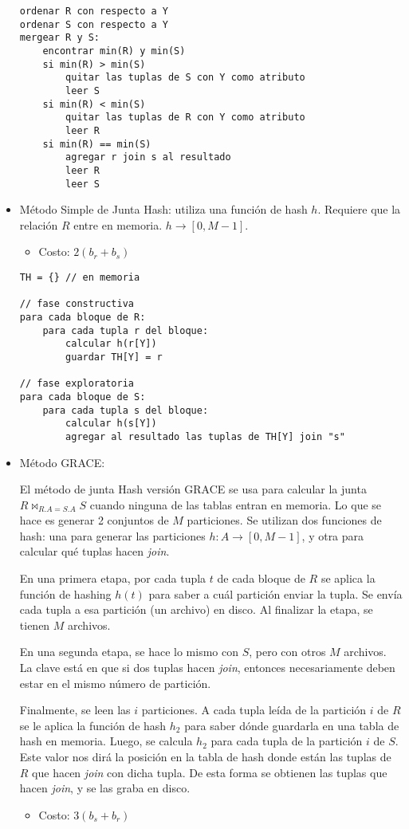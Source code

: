 \documentclass[a4paper, twoside]{article}
\begin{document}
\begin{itemize}
	\begin{lstlisting}
ordenar R con respecto a Y
ordenar S con respecto a Y
mergear R y S:
	encontrar min(R) y min(S)
	si min(R) > min(S)
		quitar las tuplas de S con Y como atributo
		leer S
	si min(R) < min(S)
		quitar las tuplas de R con Y como atributo
		leer R
	si min(R) == min(S)
		agregar r join s al resultado
		leer R
		leer S
	\end{lstlisting}

	\item Método Simple de Junta Hash: utiliza una función de hash $h$. Requiere que la relación $R$ entre en memoria. $h\to[0,M-1]$.
	\begin{itemize}
		\item Costo: $2\left(b_{r}+b_{s}\right)$
	\end{itemize}

	\begin{lstlisting}
TH = {} // en memoria

// fase constructiva
para cada bloque de R:
	para cada tupla r del bloque:
		calcular h(r[Y])
		guardar TH[Y] = r

// fase exploratoria
para cada bloque de S:
	para cada tupla s del bloque:
		calcular h(s[Y])
		agregar al resultado las tuplas de TH[Y] join "s"
	\end{lstlisting}

	\item Método GRACE:

	El método de junta Hash versión GRACE se usa para calcular la junta $R \bowtie_{R.A=S.A}S$ cuando ninguna de las tablas entran en memoria. Lo que se hace es generar 2 conjuntos de $M$ particiones. Se utilizan dos funciones de hash: una para generar las particiones $h:A\to[0,M-1]$, y otra para calcular qué tuplas hacen \emph{join}.

	En una primera etapa, por cada tupla $t$ de cada bloque de $R$ se aplica la función de hashing $h(t)$ para saber a cuál partición enviar la tupla. Se envía cada tupla a esa partición (un archivo) en disco. Al finalizar la etapa, se tienen $M$ archivos.

	En una segunda etapa, se hace lo mismo con $S$, pero con otros $M$ archivos. La clave está en que si dos tuplas hacen \emph{join}, entonces necesariamente deben estar en el mismo número de partición. 

	Finalmente, se leen las $i$ particiones. A cada tupla leída de la partición $i$ de $R$ se le aplica la función de hash $h_{2}$ para saber dónde guardarla en una tabla de hash en memoria. Luego, se calcula $h_{2}$ para cada tupla de la partición $i$ de $S$. Este valor nos dirá la posición en la tabla de hash donde están las tuplas de $R$ que hacen \emph{join} con dicha tupla. De esta forma se obtienen las tuplas que hacen \emph{join}, y se las graba en disco.
	\begin{itemize}
		\item Costo: $3\left(b_{s}+b_{r}\right)$
	\end{itemize}


\end{itemize}
\end{document}
